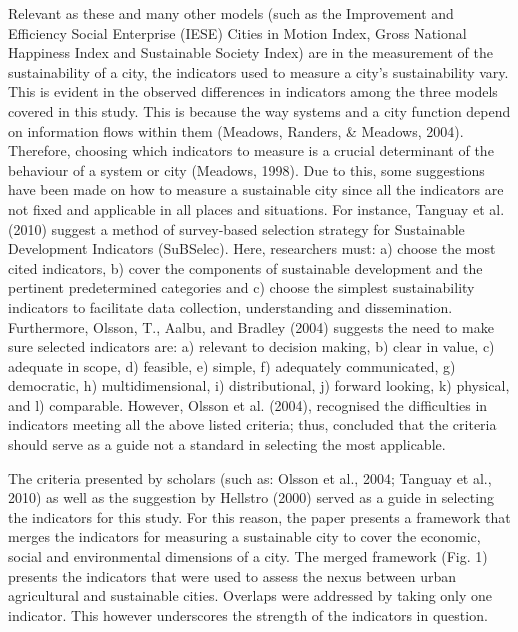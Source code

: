 Relevant as these and many other models (such as the Improvement and Efficiency Social Enterprise (IESE) Cities in Motion Index, Gross National Happiness Index and Sustainable Society Index) are in the measurement of the sustainability of a city, the indicators used to measure a city's sustainability vary. This is evident in the observed differences in indicators among the three models covered in this study. This is because the way systems and a city function depend on information flows within them (Meadows, Randers, \& Meadows, 2004). Therefore, choosing which indicators to measure is a crucial determinant of the behaviour of a system or city (Meadows, 1998). Due to this, some suggestions have been made on how to measure a sustainable city since all the indicators are not fixed and applicable in all places and situations. For instance, Tanguay et al. (2010) suggest a method of survey-based selection strategy for Sustainable Development Indicators (SuBSelec). Here, researchers must: a) choose the most cited indicators, b) cover the components of sustainable development and the pertinent predetermined categories and c) choose the simplest sustainability indicators to facilitate data collection, understanding and dissemination. Furthermore, Olsson, T., Aalbu, and Bradley (2004) suggests the need to make sure selected indicators are: a) relevant to decision making, b) clear in value, c) adequate in scope, d) feasible, e) simple, f) adequately communicated, g) democratic, h) multidimensional, i) distributional, j) forward looking, k) physical, and l) comparable. However, Olsson et al. (2004), recognised the difficulties in indicators meeting all the above listed criteria; thus, concluded that the criteria should serve as a guide not a standard in selecting the most applicable.

The criteria presented by scholars (such as: Olsson et al., 2004; Tanguay et al., 2010) as well as the suggestion by Hellstro (2000) served as a guide in selecting the indicators for this study. For this reason, the paper presents a framework that merges the indicators for measuring a sustainable city to cover the economic, social and environmental dimensions of a city. The merged framework (Fig. 1) presents the indicators that were used to assess the nexus between urban agricultural and sustainable cities. Overlaps were addressed by taking only one indicator. This however underscores the strength of the indicators in question.


